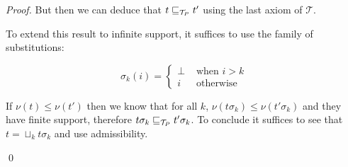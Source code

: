 \begin{proof}
    But then we can deduce that $t \sqsubseteq_{\mathcal{T}_P} t'$ using 
    the last axiom of $\mathcal{T}$.


    To extend this result to infinite support, it suffices to 
    use the family of substitutions:

    \begin{equation*}
        \sigma_k (i) = \begin{cases}
            \bot & \text{ when } i > k \\
            i    & \text{ otherwise } 
        \end{cases}
    \end{equation*}

    If $\nu (t) \leq \nu (t')$ then we know that 
    for all $k$, $\nu (t\sigma_k) \leq \nu (t'\sigma_k)$
    and they have finite support, therefore 
    $t \sigma_k \sqsubseteq_{\mathcal{T}_P} t' \sigma_k$.
    To conclude it suffices to see that $t = \sqcup_k t\sigma_k$
    and use admissibility.

\qed\end{proof}
